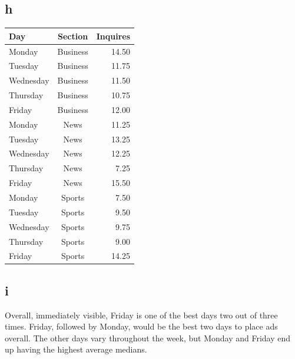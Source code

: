 \documentclass[10pt,letterpaper]{article}
\begin{document}
\subsection*{h}
\begin{tabular}{ l | c | r }
	Day & Section & Inquires\\ \hline
	Monday & Business & 14.50 \\ \hline
	Tuesday & Business & 11.75 \\ \hline
	Wednesday & Business & 11.50 \\ \hline
	Thursday & Business & 10.75 \\ \hline
	Friday & Business & 12.00 \\ \hline
	Monday & News & 11.25 \\ \hline
	Tuesday & News & 13.25 \\ \hline
	Wednesday & News & 12.25 \\ \hline
	Thursday & News & 7.25 \\ \hline
	Friday & News & 15.50 \\ \hline
	Monday & Sports & 7.50 \\ \hline
	Tuesday & Sports & 9.50 \\ \hline
	Wednesday & Sports & 9.75 \\ \hline
	Thursday & Sports & 9.00 \\ \hline
	Friday & Sports & 14.25 
\end{tabular}

\subsection*{i}
Overall, immediately visible, Friday is one of the best days two out of three
times. Friday, followed by Monday, would be the best two days to place ads
overall. The other days vary throughout the week, but Monday and Friday end up
having the highest average medians. 
\end{document}
